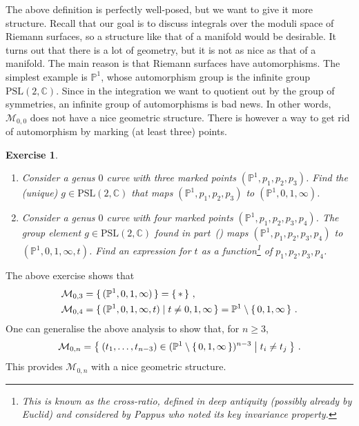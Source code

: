 \documentclass[11pt,reqno]{amsart}
\numberwithin{equation}{section}
\newcommand{\mb}[1]{\mathbb{#1}}
\newcommand{\mc}[1]{\mathcal{#1}}
\newcommand{\mr}[1]{\mathrm{#1}}
\newcommand{\C}{\mb{C}}
\renewcommand{\P}{\mb{P}}
\newcommand{\M}{\mc{M}}
\theoremstyle{plain}
\newtheorem{exercise}{Exercise}[section]
\theoremstyle{definition}
\begin{document}
The above definition is perfectly well-posed, but we want to give it more structure. Recall that our goal is to discuss integrals over the moduli space of Riemann surfaces, so a structure like that of a manifold would be desirable. It turns out that there is a lot of geometry, but it is not as nice as that of a manifold. The main reason is that Riemann surfaces have automorphisms. The simplest example is $\P^1$, whose automorphism group is the infinite group $\mr{PSL}(2,\C)$. Since in the integration we want to quotient out by the group of symmetries, an infinite group of automorphisms is bad news. In other words, $\M_{0,0}$ does not have a nice geometric structure. There is however a way to get rid of automorphism by marking (at least three) points.

\begin{exercise}\leavevmode
  \begin{enumerate}
    \item\label{ex:PSL} Consider a genus $0$ curve with three marked points $(\P^1,p_1,p_2,p_3)$. Find the (unique) $g \in \mr{PSL}(2,\C)$ that maps $(\P^1,p_1,p_2,p_3)$ to $(\P^1,0,1,\infty)$.

    \item Consider a genus $0$ curve with four marked points $(\P^1,p_1,p_2,p_3,p_4)$. The group element $g \in \mr{PSL}(2,\C)$ found in part~() maps $(\P^1,p_1,p_2,p_3,p_4)$ to $(\P^1,0,1,\infty,t)$. Find an expression for $t$ as a function\footnote{
      This is known as the \emph{cross-ratio}, defined in deep antiquity (possibly already by Euclid) and considered by Pappus who noted its key invariance property.
    } of $p_1,p_2,p_3,p_4$.
  \end{enumerate}
\end{exercise}

The above exercise shows that
\begin{equation}
\begin{aligned}
  \M_{0,3}
  &=
  \set{(\P^1,0,1,\infty)} = \set{*} \,, \\
  \M_{0,4}
  &=
  \set{ (\P^1,0,1,\infty,t) | t \neq 0,1,\infty } = \P^1 \setminus \set{0,1,\infty} \,.
\end{aligned}
\end{equation}
One can generalise the above analysis to show that, for $n \ge 3$,
\begin{equation}
  \M_{0,n}
  =
  \Set{ (t_1,\dots,t_{n-3}) \in ( \P^1 \setminus \set{0,1,\infty} )^{n-3} | t_i \neq t_j } \,.
\end{equation}
This provides $\M_{0,n}$ with a nice geometric structure.
\end{document}
